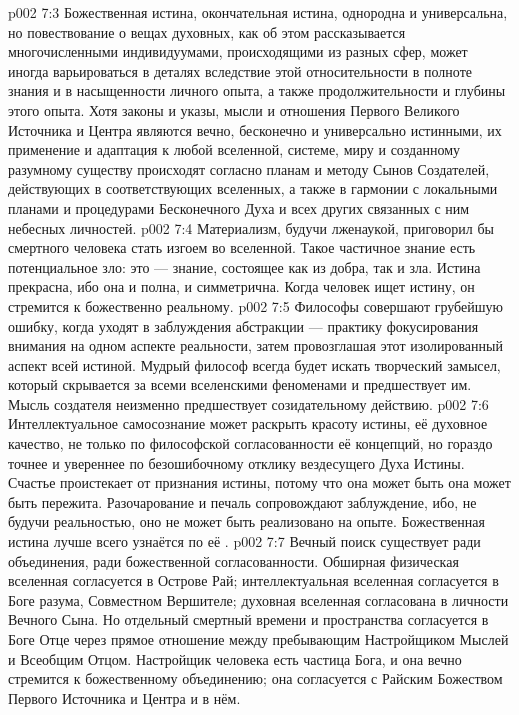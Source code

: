 \vs p002 7:3 Божественная истина, окончательная истина, однородна и универсальна, но повествование о вещах духовных, как об этом рассказывается многочисленными индивидуумами, происходящими из разных сфер, может иногда варьироваться в деталях вследствие этой относительности в полноте знания и в насыщенности личного опыта, а также продолжительности и глубины этого опыта. Хотя законы и указы, мысли и отношения Первого Великого Источника и Центра являются вечно, бесконечно и универсально истинными, их применение и адаптация к любой вселенной, системе, миру и созданному разумному существу происходят согласно планам и методу Сынов Создателей, действующих в соответствующих вселенных, а также в гармонии с локальными планами и процедурами Бесконечного Духа и всех других связанных с ним небесных личностей.
\vs p002 7:4 \pc Материализм, будучи лженаукой, приговорил бы смертного человека стать изгоем во вселенной. Такое частичное знание есть потенциальное зло: это --- знание, состоящее как из добра, так и зла. Истина прекрасна, ибо она и полна, и симметрична. Когда человек ищет истину, он стремится к божественно реальному.
\vs p002 7:5 Философы совершают грубейшую ошибку, когда уходят в заблуждения абстракции --- практику фокусирования внимания на одном аспекте реальности, затем провозглашая этот изолированный аспект всей истиной. Мудрый философ всегда будет искать творческий замысел, который скрывается за всеми вселенскими феноменами и предшествует им. Мысль создателя неизменно предшествует созидательному действию.
\vs p002 7:6 Интеллектуальное самосознание может раскрыть красоту истины, её духовное качество, не только по философской согласованности её концепций, но гораздо точнее и увереннее по безошибочному отклику вездесущего Духа Истины. Счастье проистекает от признания истины, потому что она может быть  она может быть пережита. Разочарование и печаль сопровождают заблуждение, ибо, не будучи реальностью, оно не может быть реализовано на опыте. Божественная истина лучше всего узнаётся по её .
\vs p002 7:7 \pc Вечный поиск существует ради объединения, ради божественной согласованности. Обширная физическая вселенная согласуется в Острове Рай; интеллектуальная вселенная согласуется в Боге разума, Совместном Вершителе; духовная вселенная согласована в личности Вечного Сына. Но отдельный смертный времени и пространства согласуется в Боге Отце через прямое отношение между пребывающим Настройщиком Мыслей и Всеобщим Отцом. Настройщик человека есть частица Бога, и она вечно стремится к божественному объединению; она согласуется с Райским Божеством Первого Источника и Центра и в нём.
